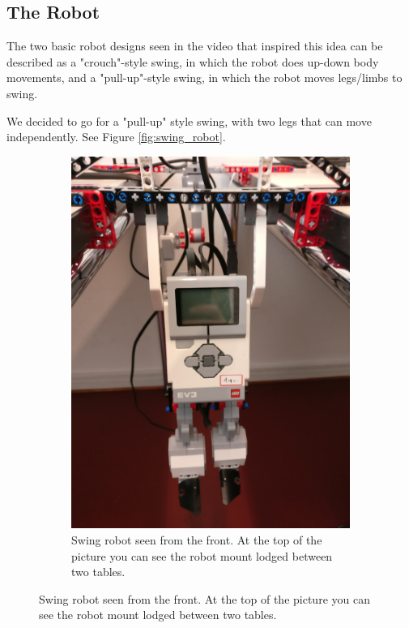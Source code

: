 \documentclass[11pt, a4paper]{article}
\begin{document}
\subsection{The Robot}
The two basic robot designs seen in the video that inspired this idea\cite{youtube_swing} can be described as a "crouch"-style swing, in which the robot does up-down body movements, and a "pull-up"-style swing, in which the robot moves legs/limbs to swing.

We decided to go for a "pull-up" style swing, with two legs that can move independently. See Figure \ref{fig:swing_robot}.

\begin{figure}[H]
	\centering
	\begin{subfigure}{.48\textwidth}
		\centering
		\includegraphics[width=1\linewidth]{images/swing_robot_front}
		\caption{Swing robot seen from the front. At the top of the picture you can see the robot mount lodged between two tables.}
		\label{fig:swing_robot_front}

\end{subfigure}
\end{figure}
\end{document}
